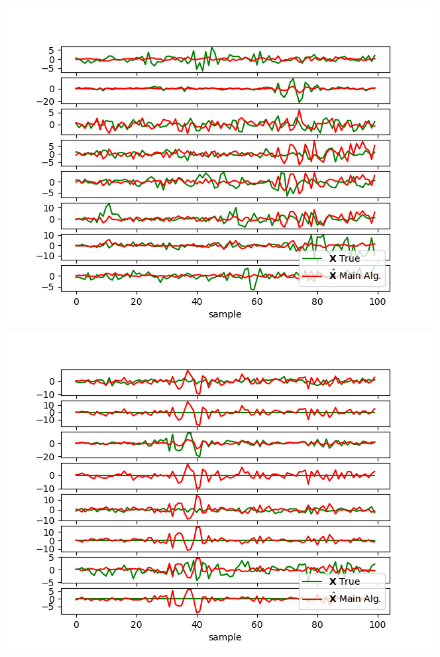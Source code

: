 \begin{figure}[H]
    \begin{minipage}[t]{.45\textwidth}
		\centering
		\includegraphics[scale=0.5]{figures/ch_estimate/k_test4.png}
	\caption{}
	\label{fig:ktest4}
    \end{minipage} 
    \hfill
    \begin{minipage}[t]{.45\textwidth}
		\centering
		\includegraphics[scale=0.5]{figures/ch_estimate/k_test5.png}
	\caption{}
	\label{fig:ktest5}
    \end{minipage}
\end{figure}

